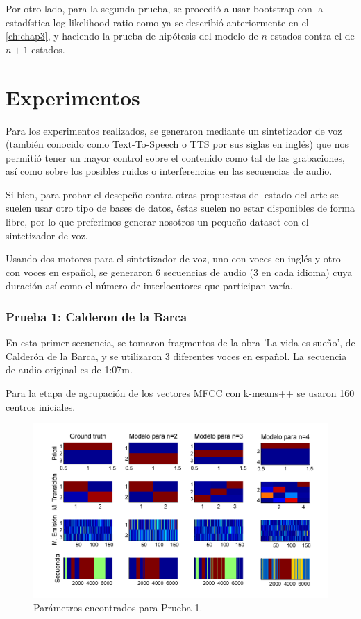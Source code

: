 Por otro lado, para la segunda prueba, se procedió a usar bootstrap con la estadística log-likelihood ratio como ya se describió anteriormente en el \autoref{ch:chap3}, y haciendo la prueba de hipótesis del modelo de $n$ estados contra el de $n+1$ estados.

\section{Experimentos} %
\label{sec:experimentos}

Para los experimentos realizados, se generaron mediante un sintetizador de voz (también conocido como Text-To-Speech o TTS por sus siglas en inglés) que nos permitió tener un mayor control sobre el contenido como tal de las grabaciones, así como sobre los posibles ruidos o interferencias en las secuencias de audio.

Si bien, para probar el desepeño contra otras propuestas del estado del arte se suelen usar otro tipo de bases de datos, éstas suelen no estar disponibles de forma libre, por lo que preferimos generar nosotros un pequeño dataset con el sintetizador de voz.

Usando dos motores para el sintetizador de voz, uno con voces en inglés y otro con voces en español, se generaron 6 secuencias de audio (3 en cada idioma) cuya duración así como el número de interlocutores que participan varía.

\subsubsection{Prueba 1: Calderon de la Barca} %
\label{ssub:calderon}

En esta primer secuencia, se tomaron fragmentos de la obra 'La vida es sueño', de Calderón de la Barca, y se utilizaron 3 diferentes voces en español. La secuencia de audio original es de 1:07m.

Para la etapa de agrupación de los vectores MFCC con k-means++ se usaron 160 centros iniciales.

\setlength{\abovecaptionskip}{-10pt plus 0pt minus 0pt}

\begin{figure}[bth]
  \centerline
  {\includegraphics[width=1.1\linewidth]{gfx/chap6/cald1}} \quad
  \caption{Parámetros encontrados para Prueba 1.}
  \label{fig:prb1_par}
\end{figure}

